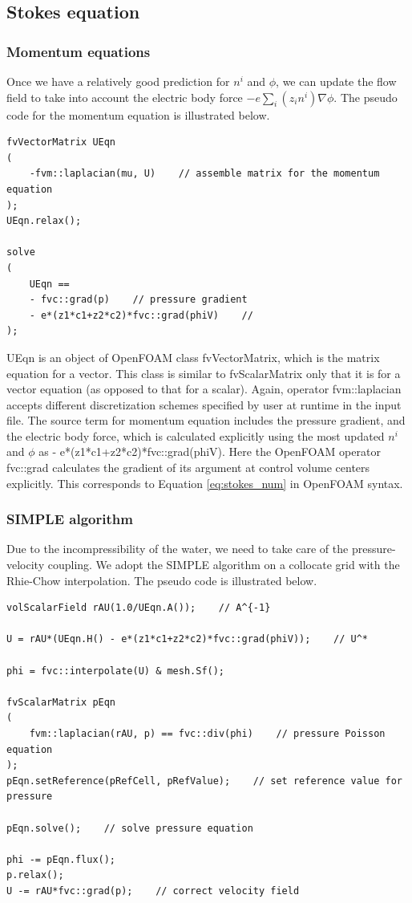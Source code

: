 \subsection{Stokes equation}
\subsubsection{Momentum equations}
Once we have a relatively good prediction for $n^i$ and $\phi$, we can update the flow field to take into account the electric body force $-e\sum_i(z_in^i)\nabla\phi$. The pseudo code for the momentum equation is illustrated below.

\begin{lstlisting}
fvVectorMatrix UEqn
(
    -fvm::laplacian(mu, U)    // assemble matrix for the momentum equation
);
UEqn.relax();

solve
(
    UEqn == 
	- fvc::grad(p)    // pressure gradient 
	- e*(z1*c1+z2*c2)*fvc::grad(phiV)    //
);
\end{lstlisting}

\textsf{UEqn} is an object of OpenFOAM class \textsf{fvVectorMatrix}, which is the matrix equation for a vector. This class is similar to \textsf{fvScalarMatrix} only that it is for a vector equation (as opposed to that for a scalar). Again, operator \textsf{fvm::laplacian} accepts different discretization schemes specified by user at runtime in the input file. The source term for momentum equation includes the pressure gradient, and the electric body force, which is calculated explicitly using the most updated $n^i$ and $\phi$ as \textsf{- e*(z1*c1+z2*c2)*fvc::grad(phiV)}. Here the OpenFOAM operator \textsf{fvc::grad} calculates the gradient of its argument at control volume centers explicitly. This corresponds to Equation \ref{eq:stokes_num} in OpenFOAM syntax.

\subsubsection{SIMPLE algorithm}
Due to the incompressibility of the water, we need to take care of the pressure-velocity coupling. We adopt the SIMPLE algorithm on a collocate grid with the Rhie-Chow interpolation. The pseudo code is illustrated below.

\begin{lstlisting}
volScalarField rAU(1.0/UEqn.A());    // A^{-1}

U = rAU*(UEqn.H() - e*(z1*c1+z2*c2)*fvc::grad(phiV));    // U^*
    
phi = fvc::interpolate(U) & mesh.Sf();    

fvScalarMatrix pEqn
(
    fvm::laplacian(rAU, p) == fvc::div(phi)    // pressure Poisson equation
);
pEqn.setReference(pRefCell, pRefValue);    // set reference value for pressure

pEqn.solve();    // solve pressure equation

phi -= pEqn.flux();
p.relax();
U -= rAU*fvc::grad(p);    // correct velocity field
\end{lstlisting}

